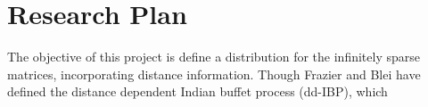 \chapter{Research Plan}%

The objective of this project is define a distribution for the infinitely
sparse matrices, incorporating distance information. Though Frazier and Blei
have defined the distance dependent Indian buffet process (dd-IBP), which


